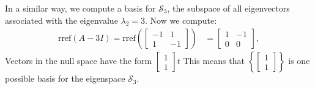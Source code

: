 \documentclass{ximera}
\begin{document}
\begin{example}
\begin{explanation}
In a similar way, we compute a basis for $\mathcal{S}_3$, the subspace of all eigenvectors associated with the eigenvalue $\lambda_2=3$.  Now we compute:
\begin{align*}\mbox{rref}(A-3I)=\mbox{rref}\left(\begin{bmatrix}-1&1\\1&-1\end{bmatrix}\right)&=\begin{bmatrix}1&-1\\0&0\end{bmatrix},
\end{align*}
Vectors in the null space have the form $\begin{bmatrix}1\\1\end{bmatrix}t$ This means that $\left\{\begin{bmatrix}1\\1\end{bmatrix}\right\}$ is one possible basis for the eigenspace $\mathcal{S}_3$.
\end{explanation}
\end{example}
    
\end{document}

